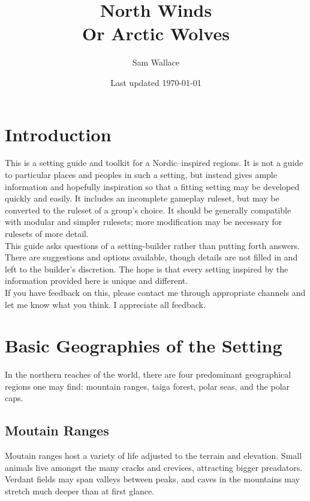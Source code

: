 \documentclass[a4paper]{article}
\title{North Winds \\
  \large Or Arctic Wolves}
\author{Sam Wallace}
\date{Last updated \today}
\begin{document}
\maketitle
\newpage
\tableofcontents

\newpage

\begin{multicols}{2}
  
\section{Introduction}

This is a setting guide and toolkit for a Nordic--inspired regions.
It is not a guide to particular places and peoples in such a setting, but instead gives ample information and hopefully inspiration so that a fitting setting may be developed quickly and easily.
It includes an incomplete gameplay ruleset, but may be converted to the ruleset of a group's choice.
It should be generally compatible with modular and simpler rulesets; more modification may be necessary for rulesets of more detail. \\

This guide asks questions of a setting-builder rather than putting forth answers.
There are suggestions and options available, though details are not filled in and left to the builder's discretion.
The hope is that every setting inspired by the information provided here is unique and different. \\

If you have feedback on this, please contact me through appropriate channels and let me know what you think.
I appreciate all feedback.


\section{Basic Geographies of the Setting}

In the northern reaches of the world, there are four predominant geographical regions one may find: mountain ranges, taiga forest, polar seas, and the polar caps.

\subsection{Moutain Ranges}

Moutain ranges host a variety of life adjusted to the terrain and elevation. Small animals live amongst the many cracks and crevices, attracting bigger preadators. Verdant fields may span valleys between peaks, and caves in the mountains may stretch much deeper than at first glance. \\


\end{multicols}
\end{document}
